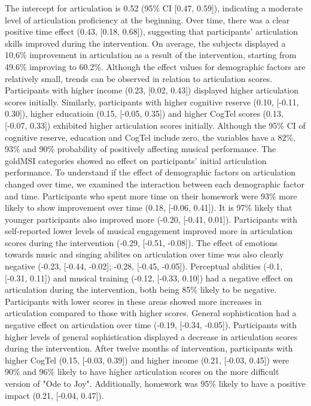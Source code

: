  The intercept for articulation is 0.52 (95\% CI [0.47, 0.59]), indicating a moderate level of articulation proficiency at the beginning. Over time, there was a clear positive time effect (0.43, [0.18, 0.68]), suggesting that participants' articulation skills improved during the intervention. On average, the subjects displayed a 10,6\% improvement in articulation as a result of the intervention, starting from 49.6\% improving to 60.2\%.
Although the effect values for demographic factors are relatively small, trends can be observed in relation to articulation scores. Participants with higher income (0.23, [0.02, 0.43]) displayed higher articulation scores initially. Similarly, participants with higher cognitive reserve (0.10, [-0.11, 0.30]), higher educatioin (0.15, [-0.05, 0.35]) and higher CogTel scores (0.13, [-0.07, 0.33]) exhibited higher articulation scores initially. Although the 95\% CI of cognitive reserve, education and CogTel include zero, the variables have a 82\%, 93\% and 90\% probability of positively affecting musical performance. The goldMSI categories showed no effect on participants' initial articulation performance. 
To understand if the effect of demographic factors on articulation changed over time, we examined the interaction between each demographic factor and time. Participants who spent more time on their homework were 93\% more likely to show improvement over time (0.18, [-0.06, 0.41]). It is 97\% likely that younger participants also improved more (-0.20, [-0.41, 0.01]).
Participants with self-reported lower levels of musical engagement improved more in articulation scores during the intervention (-0.29, [-0.51, -0.08]). The effect of emotions towards music and singing abilites on articulation over time was also clearly negative (-0.23, [-0.44, -0.02]; -0.28, [-0.45, -0.05]). Perceptual abilities (-0.1, [-0.31, 0.11]) and musical training (-0.12, [-0.33, 0.10]) had a negative effect on articulation during the intervention, both being 85\% likely to be negative. Participants with lower scores in these areas showed more increases in articulation compared to those with higher scores. General sophistication had a negative effect on articulation over time (-0.19, [-0.34, -0.05]). Participants with higher levels of general sophistication displayed a decrease in articulation scores during the intervention.
After twelve months of intervention, participants with higher CogTel (0.15, [-0.03, 0.39]) and higher income (0.21, [-0.03, 0.45])  were 90\% and  96\% likely to have higher articulation scores on the more difficult version of "Ode to Joy". Additionally, homework was 95\% likely to have a positive impact (0.21, [-0.04, 0.47]).

